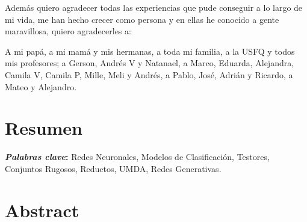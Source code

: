 \documentclass[a4paper, 12pt]{report}
\begin{document}
Además quiero agradecer todas las experiencias que pude conseguir a lo
largo de mi vida, me han hecho crecer como persona y en ellas he conocido a
gente maravillosa, quiero agradecerles a:

A mi papá, a mi mamá y mis hermanas, a toda mi familia, a la USFQ y todos mis
profesores; a Gerson, Andrés V y Natanael, a Marco, Eduarda, Alejandra, Camila V,
Camila P, Mille, Meli y Andrés, a Pablo, José, Adrián y Ricardo, a Mateo y
Alejandro.

 
\chapter*{Resumen} 
\singlespacing


\noindent
\textbf{\textit{Palabras clave}:} Redes Neuronales, Modelos de Clasificación,
Testores, Conjuntos Rugosos, Reductos, UMDA, Redes Generativas.
 

\chapter*{Abstract}
\end{document}
